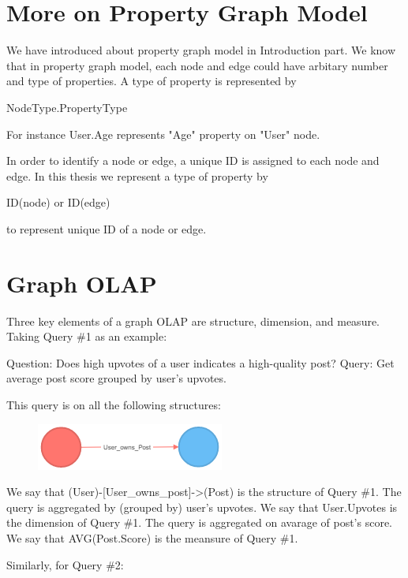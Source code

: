 \section{More on Property Graph Model}
We have introduced about property graph model in Introduction part. We know that in property graph model, each node and edge could have arbitary number and type of properties. A type of property is represented by 

NodeType.PropertyType

For instance User.Age represents "Age" property on "User" node.

In order to identify a node or edge, a unique ID is assigned to each node and edge.  In this thesis we represent a type of property by 

ID(node) or ID(edge)

to represent unique ID of a node or edge.

\section{Graph OLAP}
Three key elements of a graph OLAP are structure, dimension, and measure. Taking Query \#1 as an example: 
 
Question: 	Does high upvotes of a user indicates a high-quality post? 
Query: 		Get average post score grouped by user’s upvotes. 
 
This query is on all the following structures:

\begin {figure}[H]
\centering
\includegraphics[scale=1]{pic/21.png}
\end{figure}

We say that (User)-[User\_owns\_post]->(Post) is the structure of Query \#1.
The query is aggregated by (grouped by) user’s upvotes. We say that {User.Upvotes} is the dimension of Query \#1.
The query is aggregated on avarage of post’s score.  We say that {AVG(Post.Score)} is the meansure of Query \#1. 
 
Similarly, for Query \#2:

